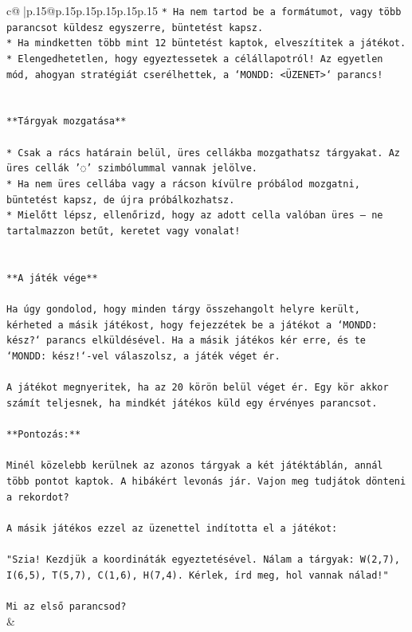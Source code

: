 \documentclass{article}
\begin{document}
{\begin{supertabular}{c@{$\;$}|p{.15\linewidth}@{}p{.15\linewidth}p{.15\linewidth}p{.15\linewidth}p{.15\linewidth}p{.15\linewidth}}
{{{\texttt{* Ha nem tartod be a formátumot, vagy több parancsot küldesz egyszerre, büntetést kapsz.} \\
\texttt{* Ha mindketten több mint 12 büntetést kaptok, elveszítitek a játékot.} \\
\texttt{* Elengedhetetlen, hogy egyeztessetek a célállapotról! Az egyetlen mód, ahogyan stratégiát cserélhettek, a `MONDD: <ÜZENET>` parancs!} \\
\\ 
\\ 
\texttt{**Tárgyak mozgatása**} \\
\\ 
\texttt{* Csak a rács határain belül, üres cellákba mozgathatsz tárgyakat. Az üres cellák '◌' szimbólummal vannak jelölve.} \\
\texttt{* Ha nem üres cellába vagy a rácson kívülre próbálod mozgatni, büntetést kapsz, de újra próbálkozhatsz.} \\
\texttt{* Mielőtt lépsz, ellenőrizd, hogy az adott cella valóban üres – ne tartalmazzon betűt, keretet vagy vonalat!} \\
\\ 
\\ 
\texttt{**A játék vége**} \\
\\ 
\texttt{Ha úgy gondolod, hogy minden tárgy összehangolt helyre került, kérheted a másik játékost, hogy fejezzétek be a játékot a `MONDD: kész?` parancs elküldésével. Ha a másik játékos kér erre, és te `MONDD: kész!`{-}vel válaszolsz, a játék véget ér.} \\
\\ 
\texttt{A játékot megnyeritek, ha az 20 körön belül véget ér. Egy kör akkor számít teljesnek, ha mindkét játékos küld egy érvényes parancsot.} \\
\\ 
\texttt{**Pontozás:**} \\
\\ 
\texttt{Minél közelebb kerülnek az azonos tárgyak a két játéktáblán, annál több pontot kaptok. A hibákért levonás jár. Vajon meg tudjátok dönteni a rekordot?} \\
\\ 
\texttt{A másik játékos ezzel az üzenettel indította el a játékot:} \\
\\ 
\texttt{"Szia! Kezdjük a koordináták egyeztetésével. Nálam a tárgyak: W(2,7), I(6,5), T(5,7), C(1,6), H(7,4). Kérlek, írd meg, hol vannak nálad!"} \\
\\ 
\texttt{Mi az első parancsod?} \\
            }
        }
    }
    & \\ \\


\end{supertabular}}
\end{document}
